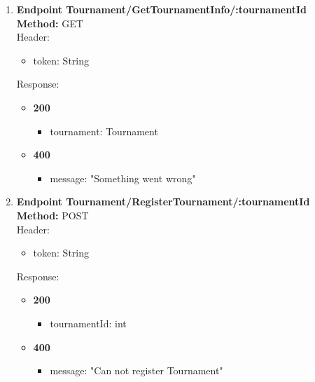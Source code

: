 \begin{enumerate}
\begin{itemize}
    \end{itemize}
    \item \textbf{Endpoint Tournament/GetTournamentInfo/:tournamentId} \\
    \textbf{Method:} GET \\
    Header:\\
    \begin{itemize}
        \item token: String
    \end{itemize}
    Response:\\
    \begin{itemize}
        \item \textbf{200} \\
        \begin{itemize}
            \item tournament: Tournament
        \end{itemize}
        \item \textbf{400} \\
        \begin{itemize}
            \item message: "Something went wrong"
        \end{itemize}
    \end{itemize}
    \item \textbf{Endpoint Tournament/RegisterTournament/:tournamentId} \\
    \textbf{Method:} POST \\
    Header:\\
    \begin{itemize}
        \item token: String
    \end{itemize}
    Response:\\
    \begin{itemize}
        \item \textbf{200} \\
        \begin{itemize}
            \item tournamentId: int
        \end{itemize}
        \item \textbf{400} \\
        \begin{itemize}
            \item message: "Can not register Tournament"
        \end{itemize}
    \end{itemize}

\end{enumerate}
